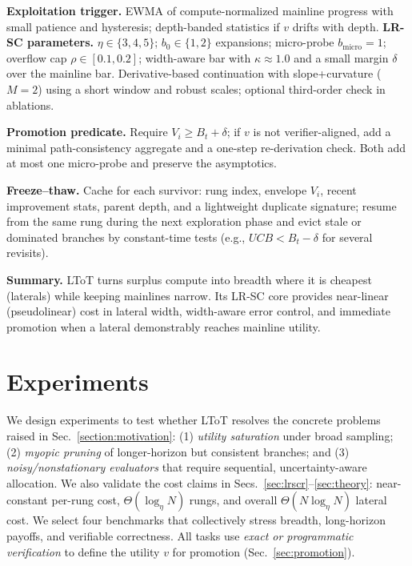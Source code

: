 \documentclass{article}
\begin{document}
\textbf{Exploitation trigger.}
EWMA of compute-normalized mainline progress with small patience and hysteresis; depth-banded statistics if $v$ drifts with depth.
\textbf{LR-SC parameters.}
$\eta\in\{3,4,5\}$; $b_0\in\{1,2\}$ expansions; micro-probe $b_{\text{micro}}=1$; overflow cap $\rho\in[0.1,0.2]$; width-aware bar with $\kappa\!\approx\!1.0$ and a small margin $\delta$ over the mainline bar.
Derivative-based continuation with slope+curvature ($M{=}2$) using a short window and robust scales; optional third-order check in ablations.

\textbf{Promotion predicate.}
Require $V_i \ge B_t + \delta$; if $v$ is not verifier-aligned, add a minimal path-consistency aggregate and a one-step re-derivation check.
Both add at most one micro-probe and preserve the asymptotics.

\textbf{Freeze--thaw.}
Cache for each survivor: rung index, envelope $V_i$, recent improvement stats, parent depth, and a lightweight duplicate signature; resume from the same rung during the next exploration phase and evict stale or dominated branches by constant-time tests (e.g., $UCB<B_t-\delta$ for several revisits).

\textbf{Summary.}
LToT turns surplus compute into breadth where it is cheapest (laterals) while keeping mainlines narrow.
Its LR-SC core provides near-linear (pseudolinear) cost in lateral width, width-aware error control, and immediate promotion when a lateral demonstrably reaches mainline utility.

\section{Experiments}
\label{section:experiments}

We design experiments to test whether LToT resolves the concrete problems raised in Sec.~\ref{section:motivation}:
(1) \emph{utility saturation} under broad sampling; (2) \emph{myopic pruning} of longer-horizon but consistent branches; and
(3) \emph{noisy/nonstationary evaluators} that require sequential, uncertainty-aware allocation.
We also validate the cost claims in Secs.~\ref{sec:lrscr}--\ref{sec:theory}:
near-constant per-rung cost, $\Theta(\log_\eta N)$ rungs, and overall $\Theta(N\log_\eta N)$ lateral cost.
We select four benchmarks that collectively stress breadth, long-horizon payoffs, and verifiable correctness.
All tasks use \emph{exact or programmatic verification} to define the utility $v$ for promotion (Sec.~\ref{sec:promotion}).
\end{document}
